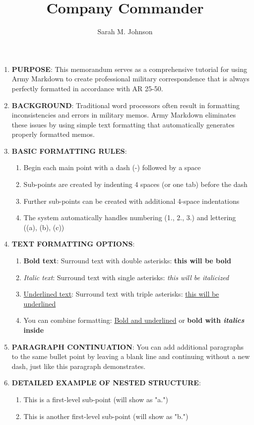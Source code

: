\documentclass{/app/resources/latex/armymemo-notikz}
\author{Sarah M. Johnson}\rank{CPT}\branch{MI}
\title{Company Commander}
\begin{document}
\begin{enumerate}
\item \textbf{PURPOSE}: This memorandum serves as a comprehensive tutorial for using Army Markdown to create professional military correspondence that is always perfectly formatted in accordance with AR 25-50.
\item \textbf{BACKGROUND}: Traditional word processors often result in formatting inconsistencies and errors in military memos. Army Markdown eliminates these issues by using simple text formatting that automatically generates properly formatted memos.
\item \textbf{BASIC FORMATTING RULES}:
\begin{enumerate}
\item Begin each main point with a dash (-) followed by a space
\item Sub-points are created by indenting 4 spaces (or one tab) before the dash
\item Further sub-points can be created with additional 4-space indentations
\item The system automatically handles numbering (1., 2., 3.) and lettering ((a), (b), (c))
\end{enumerate}
\item \textbf{TEXT FORMATTING OPTIONS}:
\begin{enumerate}
\item \textbf{Bold text}: Surround text with double asterisks: \textbf{this will be bold}
\item \textit{Italic text}: Surround text with single asterisks: \textit{this will be italicized}
\item \underline{Underlined text}: Surround text with triple asterisks: \underline{this will be underlined}
\item You can combine formatting: \underline{Bold and underlined} or \textbf{bold with \textit{italics} inside}
\end{enumerate}
\item \textbf{PARAGRAPH CONTINUATION}: You can add additional paragraphs to the same bullet point by leaving a blank line and continuing without a new dash, just like this paragraph demonstrates.
\item \textbf{DETAILED EXAMPLE OF NESTED STRUCTURE}:
\begin{enumerate}
\item This is a first-level sub-point (will show as "a.")
\item This is another first-level sub-point (will show as "b.")

\end{enumerate}
\end{enumerate}
\end{document}
